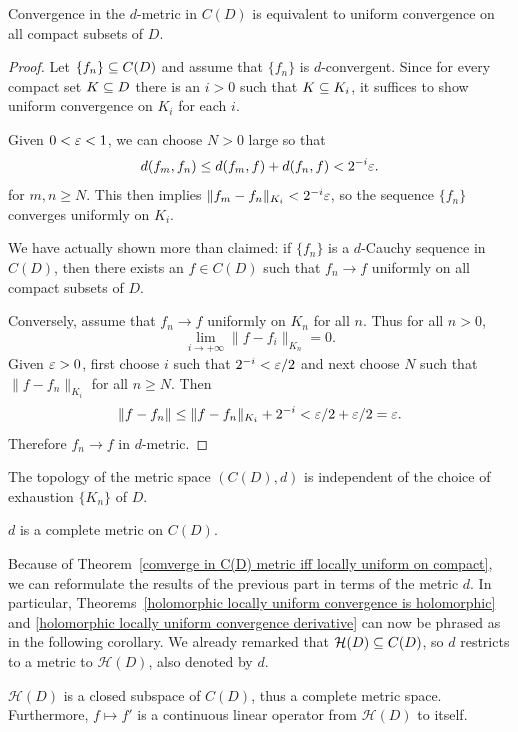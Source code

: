 \begin{theorem}\label{comverge in C(D) metric iff locally uniform on compact}
Convergence in the $d$-metric in $C(D)$ is equivalent to uniform convergence on all compact subsets of $D$.
\end{theorem}
\begin{proof}
Let $\{f_n\}\subseteq C(D)$ and assume that $\{f_n\}$ is $d$-convergent. Since for every compact set $K\subseteq D$ there is an $i>0$ such that $K\subseteq K_i$, it suffices to show uniform convergence on $K_i$ for each $i$.\par
Given $0<\varepsilon<1$, we can choose $N>0$ large so that
\[d(f_m,f_n)\leq d(f_m,f)+d(f_n,f)<2^{-i}\varepsilon.\]
for $m,n\geq N$. This then implies $\|f_m-f_n\|_{K_i}<2^{-i}\varepsilon$, so the sequence $\{f_n\}$ converges uniformly on $K_i$.\par
We have actually shown more than claimed: if $\{f_n\}$ is a $d$-Cauchy sequence in $C(D)$, then there exists an $f\in C(D)$ such that $f_n\to f$ uniformly on all compact subsets of $D$.\par
Conversely, assume that $f_n\to f$ uniformly on $K_n$ for all $n$. Thus for all $n>0$,
\[\lim_{i\to+\infty}\|f-f_i\|_{K_n}=0.\]
Given $\varepsilon>0$, first choose $i$ such that $2^{-i}<\varepsilon/2$ and next choose $N$ such that $\|f-f_n\|_{K_i}$ for all $n\geq N$. Then
\[\|f-f_n\|\leq\|f-f_n\|_{K_i}+2^{-i}<\varepsilon/2+\varepsilon/2=\varepsilon.\]
Therefore $f_n\to f$ in $d$-metric.
\end{proof}
\begin{corollary}
The topology of the metric space $(C(D),d)$ is independent of the choice of exhaustion $\{K_n\}$ of $D$.
\end{corollary}
\begin{corollary}
$d$ is a complete metric on $C(D)$.
\end{corollary}
Because of Theorem~\ref{comverge in C(D) metric iff locally uniform on compact}, we can reformulate the results of the previous part in terms of the metric $d$. In particular, Theorems~\ref{holomorphic locally uniform convergence is holomorphic} and \ref{holomorphic locally uniform convergence derivative} can now be phrased as in the following corollary. We already remarked that $\mathcal{H}(D)\subseteq C(D)$, so $d$ restricts to a metric to $\mathcal{H}(D)$, also denoted by $d$.
\begin{corollary}
$\mathcal{H}(D)$ is a closed subspace of $C(D)$, thus a complete metric space. Furthermore, $f\mapsto f'$ is a continuous linear operator from $\mathcal{H}(D)$ to itself.
\end{corollary}
